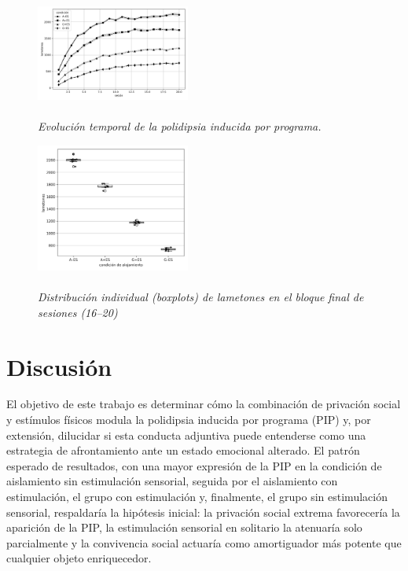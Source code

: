 \documentclass[12pt,a4paper]{article}
\begin{document}
\begin{multicols}{2}
\begin{figure}[H]
\begin{doublespace}
\captionsetup{labelfont=bf, labelsep=none}
\caption{\textit{\protect\\Evolución temporal de la polidipsia inducida por programa.}}
\label{fig:figura1}
\end{doublespace}
\centering
\includegraphics[width=0.45\textwidth]{figura1.png}
\end{figure}

\begin{figure}[H]
\begin{doublespace}
\captionsetup{labelfont=bf, labelsep=none}    
\caption{\textit{\protect\\Distribución individual (boxplots) de lametones en el bloque final de sesiones (16–20)}}
\label{fig:figura2}
\end{doublespace}
\centering
\includegraphics[width=0.45\textwidth]{figura2.png}
\end{figure}


\section{Discusión}

El objetivo de este trabajo es determinar cómo la combinación de privación social y estímulos físicos modula la polidipsia inducida por programa (PIP) y, por extensión, dilucidar si esta conducta adjuntiva puede entenderse como una estrategia de afrontamiento ante un estado emocional alterado. El patrón esperado de resultados, con una mayor expresión de la PIP en la condición de aislamiento sin estimulación sensorial, seguida por el aislamiento con estimulación, el grupo con estimulación y, finalmente, el grupo sin estimulación sensorial, respaldaría la hipótesis inicial: la privación social extrema favorecería la aparición de la PIP, la estimulación sensorial en solitario la atenuaría solo parcialmente y la convivencia social actuaría como amortiguador más potente que cualquier objeto enriquecedor.


\end{multicols}
\end{document}
